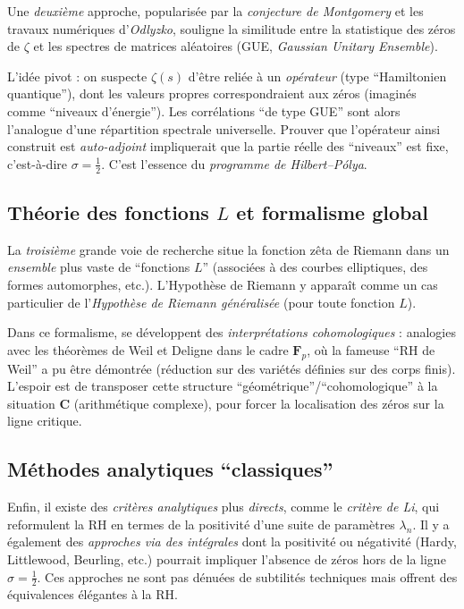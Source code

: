 \documentclass[11pt]{article}
\begin{document}
Une \emph{deuxième} approche, popularisée par la \emph{conjecture de Montgomery} et les travaux numériques d’\emph{Odlyzko}, souligne la similitude entre la statistique des zéros de $\zeta$ et les spectres de matrices aléatoires (GUE, \emph{Gaussian Unitary Ensemble}). 

L'idée pivot : on suspecte $\zeta(s)$ d'être reliée à un \emph{opérateur} (type “Hamiltonien quantique”), dont les valeurs propres correspondraient aux zéros (imaginés comme “niveaux d'énergie”). Les corrélations “de type GUE” sont alors l'analogue d'une répartition spectrale universelle. Prouver que l'opérateur ainsi construit est \emph{auto-adjoint} impliquerait que la partie réelle des “niveaux” est fixe, c'est-à-dire \(\sigma=\tfrac12\). C'est l'essence du \emph{programme de Hilbert--Pólya}.

\subsection{Théorie des fonctions $L$ et formalisme global}

La \emph{troisième} grande voie de recherche situe la fonction zêta de Riemann dans un \emph{ensemble} plus vaste de “fonctions $L$” (associées à des courbes elliptiques, des formes automorphes, etc.). L’Hypothèse de Riemann y apparaît comme un cas particulier de l’\emph{Hypothèse de Riemann généralisée} (pour toute fonction $L$). 

Dans ce formalisme, se développent des \emph{interprétations cohomologiques} : analogies avec les théorèmes de Weil et Deligne dans le cadre \(\mathbf{F}_p\), où la fameuse “RH de Weil” a pu être démontrée (réduction sur des variétés définies sur des corps finis). L’espoir est de transposer cette structure “géométrique”/“cohomologique” à la situation \(\mathbf{C}\) (arithmétique complexe), pour forcer la localisation des zéros sur la ligne critique.

\subsection{Méthodes analytiques “classiques”}

Enfin, il existe des \emph{critères analytiques} plus \emph{directs}, comme le \emph{critère de Li}, qui reformulent la RH en termes de la positivité d'une suite de paramètres \(\lambda_n\). Il y a également des \emph{approches via des intégrales} dont la positivité ou négativité (Hardy, Littlewood, Beurling, etc.) pourrait impliquer l'absence de zéros hors de la ligne \(\sigma=\tfrac12\). Ces approches ne sont pas dénuées de subtilités techniques mais offrent des équivalences élégantes à la RH.
\end{document}

